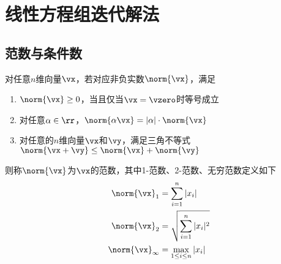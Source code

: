 
\section{线性方程组迭代解法}
\subsection{范数与条件数}
\begin{definition}[向量的范数]
    对任意$n$维向量$\vx$，若对应非负实数$\norm{\vx}$，满足
    \begin{enumerate}
        \item $\norm{\vx}\geq 0$，当且仅当$\vx=\vzero$时等号成立
        \item 对任意$\alpha\in\rr$，$\norm{\alpha\vx}=|\alpha|\cdot\norm{\vx}$
        \item 对任意的$n$维向量$\vx$和$\vy$，满足三角不等式$\norm{\vx+\vy}\leq\norm{\vx}+\norm{\vy}$
    \end{enumerate}
    则称$\norm{\vx}$为$\vx$的范数，其中1-范数、2-范数、无穷范数定义如下
    \[\begin{aligned}
        \norm{\vx}_1&=\sum_{i=1}^n|x_i|\\
        \norm{\vx}_2&=\sqrt{\sum_{i=1}^n|x_i|^2}\\
        \norm{\vx}_\infty&=\max_{1\leq i\leq n}|x_i|
    \end{aligned}\]
\end{definition}

